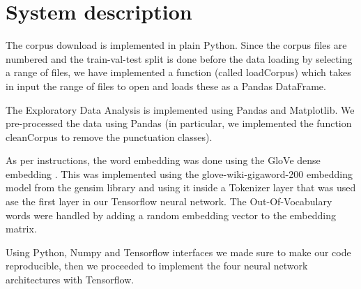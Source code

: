 \documentclass[11pt]{article}
\begin{document}
\section{System description}
\label{sec:system}


The corpus download is implemented in plain Python.
Since the corpus files are numbered and the train-val-test split is done before the data loading by selecting a range of files, we have implemented a function (called loadCorpus) which takes in input the range of files to open and loads these as a Pandas DataFrame.

The Exploratory Data Analysis is implemented using Pandas and Matplotlib.
We pre-processed the data using Pandas (in particular, we implemented the function cleanCorpus to remove the punctuation classes).

As per instructions, the word embedding was done using the GloVe dense embedding \cite{pennington-etal-2014-glove}.
This was implemented using the glove-wiki-gigaword-200 embedding model from the gensim library \cite{rehurek_lrec} and using it inside a Tokenizer layer that was used ase the first layer in our Tensorflow neural network.
The Out-Of-Vocabulary words were handled by adding a random embedding vector to the embedding matrix.

Using Python, Numpy and Tensorflow interfaces we made sure to make our code reproducible, then we proceeded to implement the four neural network architectures with Tensorflow.
\end{document}
